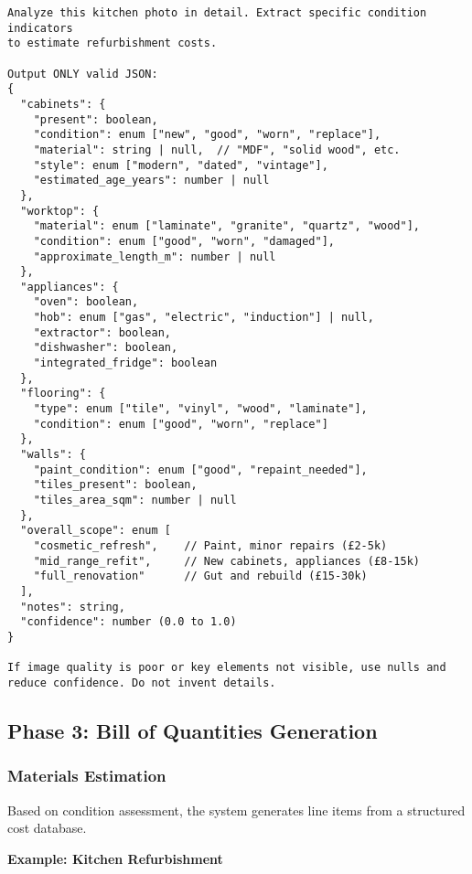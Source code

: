 \documentclass[11pt,a4paper]{article}
\begin{document}
\begin{lstlisting}[caption=Condition Assessment Prompt (Kitchen Example)]
Analyze this kitchen photo in detail. Extract specific condition indicators
to estimate refurbishment costs.

Output ONLY valid JSON:
{
  "cabinets": {
    "present": boolean,
    "condition": enum ["new", "good", "worn", "replace"],
    "material": string | null,  // "MDF", "solid wood", etc.
    "style": enum ["modern", "dated", "vintage"],
    "estimated_age_years": number | null
  },
  "worktop": {
    "material": enum ["laminate", "granite", "quartz", "wood"],
    "condition": enum ["good", "worn", "damaged"],
    "approximate_length_m": number | null
  },
  "appliances": {
    "oven": boolean,
    "hob": enum ["gas", "electric", "induction"] | null,
    "extractor": boolean,
    "dishwasher": boolean,
    "integrated_fridge": boolean
  },
  "flooring": {
    "type": enum ["tile", "vinyl", "wood", "laminate"],
    "condition": enum ["good", "worn", "replace"]
  },
  "walls": {
    "paint_condition": enum ["good", "repaint_needed"],
    "tiles_present": boolean,
    "tiles_area_sqm": number | null
  },
  "overall_scope": enum [
    "cosmetic_refresh",    // Paint, minor repairs (£2-5k)
    "mid_range_refit",     // New cabinets, appliances (£8-15k)
    "full_renovation"      // Gut and rebuild (£15-30k)
  ],
  "notes": string,
  "confidence": number (0.0 to 1.0)
}

If image quality is poor or key elements not visible, use nulls and
reduce confidence. Do not invent details.
\end{lstlisting}

\subsection{Phase 3: Bill of Quantities Generation}

\subsubsection{Materials Estimation}

Based on condition assessment, the system generates line items from a structured cost database.

\textbf{Example: Kitchen Refurbishment}
\end{document}

